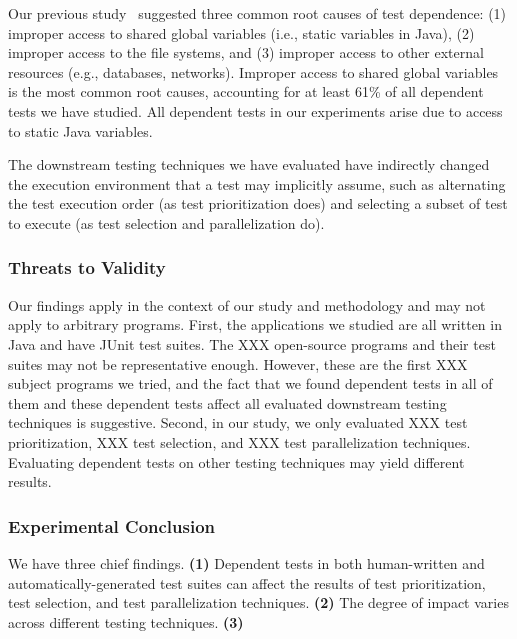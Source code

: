 Our previous study~\cite{} suggested three common
root causes of test dependence: (1) improper access
to shared global variables (i.e., static
variables in Java), (2) improper access
to the file systems, and (3) improper access
to other external resources (e.g., databases,
networks). Improper access to
shared global variables is the most common
root causes, accounting for at least 61\% of 
all dependent tests we have studied. All dependent
tests in our experiments arise due to access
to static Java variables.

The downstream testing techniques we have evaluated
have indirectly changed the execution environment
that a test may implicitly assume, such as alternating
the test execution order (as test prioritization
does) and selecting a subset of
test to execute (as test selection and parallelization
do).



\subsubsection{Threats to Validity}

Our findings apply in the context of our
study and methodology and may not apply to arbitrary
programs. First, the applications we studied are all written
in Java and have JUnit test suites.
The XXX open-source programs and
their test suites may not be representative enough.
However, these are the first XXX subject programs we
tried, and the fact that we found dependent tests in all of
them and these dependent tests affect all evaluated
downstream testing techniques is suggestive.
Second, in our study, we only evaluated XXX
test prioritization, XXX test selection, and
XXX test parallelization techniques. Evaluating
dependent tests on other testing techniques
may yield different results.

\subsubsection{Experimental Conclusion}

We have three chief findings. \textbf{(1)}
Dependent tests in both human-written
and automatically-generated test suites
can affect the results of test prioritization,
test selection, and test parallelization
techniques. \textbf{(2)} The degree of 
impact varies across different testing
techniques. 
\textbf{(3)} 
